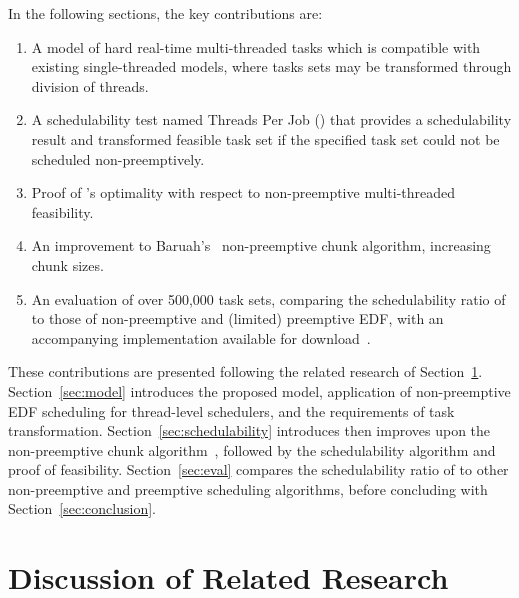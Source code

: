 \documentclass[a4paper,UKenglish,cleveref,autoref,english]{lipics-v2019}
\begin{document}
In the following sections, the key contributions are:
\begin{enumerate}
  \item A model of hard real-time multi-threaded tasks which is
    compatible with existing single-threaded models, where tasks sets
    may be transformed through division of threads.
  \item A schedulability test named Threads Per Job (\tpj{}) that provides a
    schedulability result and transformed feasible task set if the
    specified task set could not be scheduled non-preemptively.
  \item Proof of \tpj{}'s optimality with respect to non-preemptive
    multi-threaded feasibility.
  \item An improvement to Baruah's~\cite{Baruah:2005}
    non-preemptive chunk algorithm, increasing chunk sizes.
  \item An evaluation of over 500,000 task sets, comparing the
    schedulability ratio of \tpj{} to those of non-preemptive and
    (limited) preemptive EDF, with an accompanying implementation available for
    download~\cite{NPM-Artifact:2019}.
\end{enumerate}

These contributions are presented following the related
research of Section~\ref{sec:related}. Section~\ref{sec:model}
introduces the proposed model, application of non-preemptive EDF
scheduling for thread-level schedulers, and the requirements of task
transformation. Section~\ref{sec:schedulability} introduces then
improves upon the non-preemptive chunk algorithm~\cite{Baruah:2005},
followed by the \tpj{} schedulability algorithm and proof of
feasibility. Section~\ref{sec:eval} compares the schedulability ratio
of \tpj{} to other non-preemptive and preemptive scheduling
algorithms, before concluding with Section~\ref{sec:conclusion}. 

\section{Discussion of Related Research}
\label{sec:related}
\end{document}

